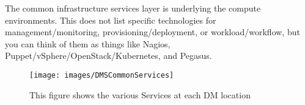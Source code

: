 The common infrastructure services layer is underlying the compute environments. 
This does not list  specific technologies for management/monitoring,
provisioning/deployment, or workload/workflow, but you can think of them
as things like Nagios, Puppet/vSphere/OpenStack/Kubernetes, and Pegasus.

\begin{figure}[htbp]
\begin{center}
 \texttt{[image: images/DMSCommonServices]}
\caption{This figure shows the various Services at each DM location \label{fig:dcs}}
\end{center}
\end{figure}



